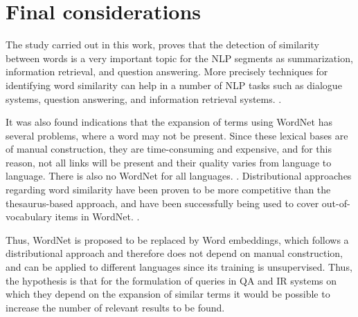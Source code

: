 \section{Final considerations}\label{chap:conclusions}

The study carried out in this work, proves that the detection of similarity between words is a very important topic for the NLP segments as summarization, information retrieval, and question answering. More precisely techniques for identifying word similarity can help in a number of NLP tasks such as dialogue systems, question answering, and information retrieval systems. \cite{Islam2007ApplicationsOC,Pilehvar2013,Agirre2009}.

It was also found indications that the expansion of terms using WordNet has several problems, where a word may not be present. Since these lexical bases are of manual construction, they are time-consuming and expensive, and for this reason, not all links will be present and their quality varies from language to language.  There is also no WordNet for all languages. \cite{Leeuwenberga2016}. Distributional approaches regarding word similarity have been proven to be more competitive than the thesaurus-based approach, and have been successfully being used to cover out-of-vocabulary items in WordNet.  \cite{Agirre2009}.


Thus, WordNet is proposed to be replaced by Word embeddings, which follows a distributional approach and therefore does not depend on manual construction, and can be applied to different languages since its training is unsupervised. Thus, the hypothesis is that for the formulation of queries in QA and IR systems on which they depend on the expansion of similar terms it would be possible to increase the number of relevant results to be found.






 
 